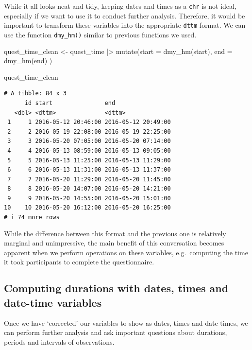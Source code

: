 \documentclass[
  letterpaper,
  DIV=11,
  numbers=noendperiod]{scrreprt}
\newenvironment{Shaded}{\begin{snugshade}}{\end{snugshade}}
\newcommand{\AttributeTok}[1]{\textcolor[rgb]{0.40,0.45,0.13}{#1}}
\newcommand{\FunctionTok}[1]{\textcolor[rgb]{0.28,0.35,0.67}{#1}}
\newcommand{\NormalTok}[1]{\textcolor[rgb]{0.00,0.23,0.31}{#1}}
\newcommand{\OtherTok}[1]{\textcolor[rgb]{0.00,0.23,0.31}{#1}}
\newcommand{\SpecialCharTok}[1]{\textcolor[rgb]{0.37,0.37,0.37}{#1}}
\begin{document}
While it all looks neat and tidy, keeping dates and times as a
\texttt{chr} is not ideal, especially if we want to use it to conduct
further analysis. Therefore, it would be important to transform these
variables into the appropriate \texttt{dttm} format. We can use the
function \texttt{dmy\_hm()} similar to previous functions we used.

\begin{Shaded}
\begin{Highlighting}[]
\NormalTok{quest\_time\_clean }\OtherTok{\textless{}{-}}
\NormalTok{  quest\_time }\SpecialCharTok{|\textgreater{}}
  \FunctionTok{mutate}\NormalTok{(}\AttributeTok{start =} \FunctionTok{dmy\_hm}\NormalTok{(start),}
         \AttributeTok{end =} \FunctionTok{dmy\_hm}\NormalTok{(end)}
\NormalTok{         )}

\NormalTok{quest\_time\_clean}
\end{Highlighting}
\end{Shaded}

\begin{verbatim}
# A tibble: 84 x 3
      id start               end                
   <dbl> <dttm>              <dttm>             
 1     1 2016-05-12 20:46:00 2016-05-12 20:49:00
 2     2 2016-05-19 22:08:00 2016-05-19 22:25:00
 3     3 2016-05-20 07:05:00 2016-05-20 07:14:00
 4     4 2016-05-13 08:59:00 2016-05-13 09:05:00
 5     5 2016-05-13 11:25:00 2016-05-13 11:29:00
 6     6 2016-05-13 11:31:00 2016-05-13 11:37:00
 7     7 2016-05-20 11:29:00 2016-05-20 11:45:00
 8     8 2016-05-20 14:07:00 2016-05-20 14:21:00
 9     9 2016-05-20 14:55:00 2016-05-20 15:01:00
10    10 2016-05-20 16:12:00 2016-05-20 16:25:00
# i 74 more rows
\end{verbatim}

While the difference between this format and the previous one is
relatively marginal and unimpressive, the main benefit of this
conversation becomes apparent when we perform operations on these
variables, e.g.~computing the time it took participants to complete the
questionnaire.

\subsection{Computing durations with dates, times and date-time
variables}\label{sec-computation-dates-times}

Once we have `corrected' our variables to show as dates, times and
date-times, we can perform further analysis and ask important questions
about durations, periods and intervals of observations.
\end{document}
